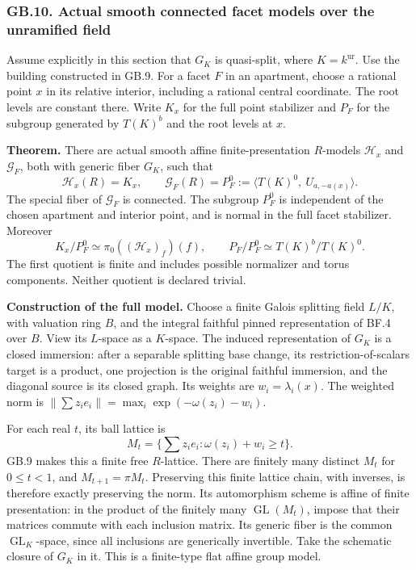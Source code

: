 \documentclass[
  11pt,
]{article}
\begin{document}
\subsubsection{GB.10. Actual smooth connected facet models over the
unramified
field}\label{gb.10.-actual-smooth-connected-facet-models-over-the-unramified-field}

Assume explicitly in this section that \(G_K\) is quasi-split, where
\(K=k^{\mathrm{ur}}\). Use the building constructed in GB.9. For a facet
\(F\) in an apartment, choose a rational point \(x\) in its relative
interior, including a rational central coordinate. The root levels are
constant there. Write \(K_x\) for the full point stabilizer and \(P_F\)
for the subgroup generated by \(T(K)^b\) and the root levels at \(x\).

\textbf{Theorem.} There are actual smooth affine finite-presentation
\(R\)-models \(\mathcal H_x\) and \(\mathcal G_F\), both with generic
fiber \(G_K\), such that \[
 \mathcal H_x(R)=K_x,\qquad
 \mathcal G_F(R)=P_F^0:=\langle T(K)^0,\ U_{a,-a(x)}\rangle.
 \tag{GB.32}
\] The special fiber of \(\mathcal G_F\) is connected. The subgroup
\(P_F^0\) is independent of the chosen apartment and interior point, and
is normal in the full facet stabilizer. Moreover \[
 K_x/P_F^0\simeq \pi_0((\mathcal H_x)_f)(f),\qquad
 P_F/P_F^0\simeq T(K)^b/T(K)^0.
 \tag{GB.33}
\] The first quotient is finite and includes possible normalizer and
torus components. Neither quotient is declared trivial.

\textbf{Construction of the full model.} Choose a finite Galois
splitting field \(L/K\), with valuation ring \(B\), and the integral
faithful pinned representation of BF.4 over \(B\). View its \(L\)-space
as a \(K\)-space. The induced representation of \(G_K\) is a closed
immersion: after a separable splitting base change, its
restriction-of-scalars target is a product, one projection is the
original faithful immersion, and the diagonal source is its closed
graph. Its weights are \(w_i=\lambda_i(x)\). The weighted norm is
\(\|\sum z_i e_i\|=\max_i\exp(-\omega(z_i)-w_i)\).

For each real \(t\), its ball lattice is \[
 M_t=\{\sum z_i e_i:\omega(z_i)+w_i\geq t\}.
 \tag{GB.34}
\] GB.9 makes this a finite free \(R\)-lattice. There are finitely many
distinct \(M_t\) for \(0\leq t<1\), and \(M_{t+1}=\pi M_t\). Preserving
this finite lattice chain, with inverses, is therefore exactly
preserving the norm. Its automorphism scheme is affine of finite
presentation: in the product of the finitely many
\(\operatorname {GL}(M_t)\), impose that their matrices commute with
each inclusion matrix. Its generic fiber is the common
\(\operatorname {GL}_K\)-space, since all inclusions are generically
invertible. Take the schematic closure of \(G_K\) in it. This is a
finite-type flat affine group model.
\end{document}
